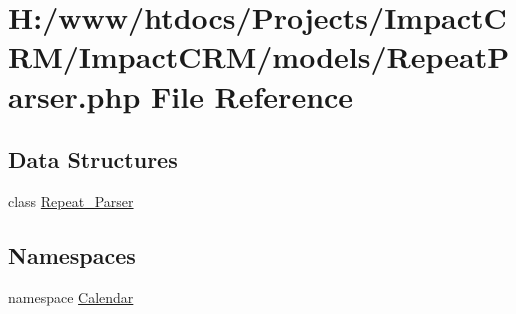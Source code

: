 \hypertarget{RepeatParser_8php}{
\section{H:/www/htdocs/Projects/ImpactCRM/ImpactCRM/models/RepeatParser.php File Reference}
\label{RepeatParser_8php}
}
\subsection*{Data Structures}
\begin{DoxyCompactItemize}
\item 
class \hyperlink{classRepeat__Parser}{Repeat\_\-Parser}
\end{DoxyCompactItemize}
\subsection*{Namespaces}
\begin{DoxyCompactItemize}
\item 
namespace \hyperlink{namespaceCalendar}{Calendar}
\end{DoxyCompactItemize}
